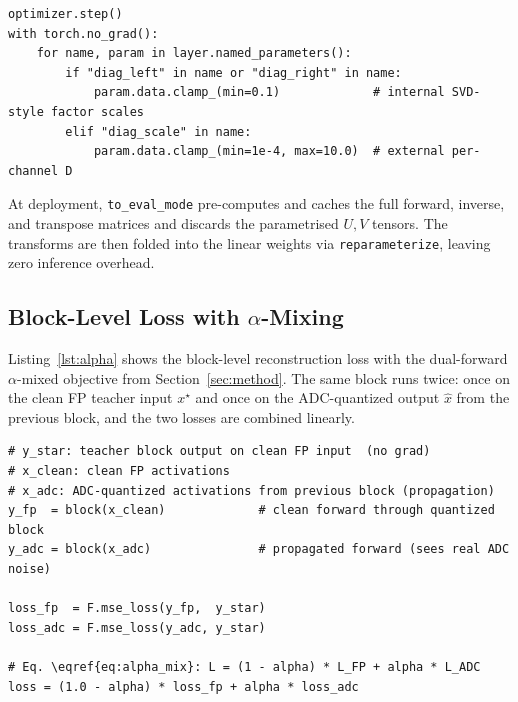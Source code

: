 \documentclass[a4paper,11pt,oneside]{article}
\theoremstyle{breakstyle}
\begin{document}
\begin{lstlisting}[label={lst:diag_proj},caption={Bounded-diagonal projection step in calibrate\_flat\_quant, applied after every optimizer.step(). This is where the working bounds on diag\_scale (range 1e-4 to 10) and diag\_left/diag\_right (minimum 0.1) are actually enforced.}]
optimizer.step()
with torch.no_grad():
    for name, param in layer.named_parameters():
        if "diag_left" in name or "diag_right" in name:
            param.data.clamp_(min=0.1)             # internal SVD-style factor scales
        elif "diag_scale" in name:
            param.data.clamp_(min=1e-4, max=10.0)  # external per-channel D
\end{lstlisting}

  At deployment, \texttt{to\_eval\_mode} pre-computes and caches the
  full forward, inverse, and transpose matrices and discards the
  parametrised $U, V$ tensors. The transforms are then folded into
  the linear weights via \texttt{reparameterize}, leaving zero
  inference overhead.

  \subsection[Block-Level Loss with Alpha-Mixing]%
             {Block-Level Loss with $\alpha$-Mixing}
  \label{app:code:alpha}

  Listing~\ref{lst:alpha} shows the block-level reconstruction loss
  with the dual-forward $\alpha$-mixed objective from
  Section~\ref{sec:method}. The same block runs twice: once on the
  clean FP teacher input $x^\star$ and once on the ADC-quantized
  output $\hat{x}$ from the previous block, and the two losses are
  combined linearly.

\begin{lstlisting}[label={lst:alpha},caption={Block-level $\alpha$-mixed reconstruction loss.}]
# y_star: teacher block output on clean FP input  (no grad)
# x_clean: clean FP activations
# x_adc: ADC-quantized activations from previous block (propagation)
y_fp  = block(x_clean)             # clean forward through quantized block
y_adc = block(x_adc)               # propagated forward (sees real ADC noise)

loss_fp  = F.mse_loss(y_fp,  y_star)
loss_adc = F.mse_loss(y_adc, y_star)

# Eq. \eqref{eq:alpha_mix}: L = (1 - alpha) * L_FP + alpha * L_ADC
loss = (1.0 - alpha) * loss_fp + alpha * loss_adc
\end{lstlisting}
\end{document}
